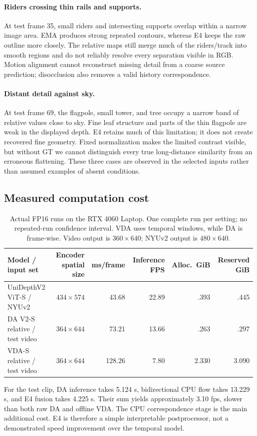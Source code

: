 \paragraph{Riders crossing thin rails and supports.}
At test frame 35, small riders and intersecting supports overlap within a narrow image area. EMA produces strong repeated contours, whereas E4 keeps the raw outline more closely. The relative maps still merge much of the riders/track into smooth regions and do not reliably resolve every separation visible in RGB. Motion alignment cannot reconstruct missing detail from a coarse source prediction; disocclusion also removes a valid history correspondence.

\paragraph{Distant detail against sky.}
At test frame 69, the flagpole, small tower, and tree occupy a narrow band of relative values close to sky. Fine leaf structure and parts of the thin flagpole are weak in the displayed depth. E4 retains much of this limitation; it does not create recovered fine geometry. Fixed normalization makes the limited contrast visible, but without GT we cannot distinguish every true long-distance similarity from an erroneous flattening. These three cases are observed in the selected inputs rather than assumed examples of absent conditions.

\subsection{Measured computation cost}
\begin{table}[t]
\centering\small
\begin{tabular}{lrrrrr}
\toprule
Model / input set & Encoder spatial size & ms/frame & Inference FPS & Alloc.\ GiB & Reserved GiB\\\midrule
UniDepthV2 ViT-S / NYUv2 & $434\times574$ & 43.68 & 22.89 & .393 & .445\\
DA V2-S relative / test video & $364\times644$ & 73.21 & 13.66 & .263 & .297\\
VDA-S relative / test video & $364\times644$ & 128.26 & 7.80 & 2.330 & 3.090\\\bottomrule
\end{tabular}
\caption{Actual FP16 runs on the RTX 4060 Laptop. One complete run per setting; no repeated-run confidence interval. VDA uses temporal windows, while DA is frame-wise. Video output is $360\times640$; NYUv2 output is $480\times640$.}
\label{tab:cost}
\end{table}
For the test clip, DA inference takes 5.124 s, bidirectional CPU flow takes 13.229 s, and E4 fusion takes 4.225 s. Their sum yields approximately 3.10 fps, slower than both raw DA and offline VDA. The CPU correspondence stage is the main additional cost. E4 is therefore a simple interpretable postprocessor, not a demonstrated speed improvement over the temporal model.


